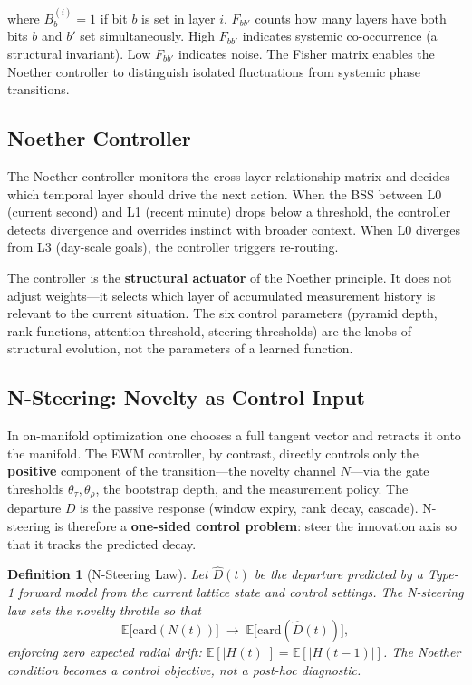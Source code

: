 \documentclass[11pt,a4paper]{article}
\newtheorem{definition}{Definition}[section]
\theoremstyle{remark}
\begin{document}
where $B^{(i)}_b = 1$ if bit $b$ is set in layer $i$. $F_{bb'}$ counts how many layers
have both bits $b$ and $b'$ set simultaneously. High $F_{bb'}$ indicates systemic
co-occurrence (a structural invariant). Low $F_{bb'}$ indicates noise. The Fisher matrix
enables the Noether controller to distinguish isolated fluctuations from systemic phase
transitions.

\subsection{Noether Controller}

The Noether controller monitors the cross-layer relationship matrix and decides which
temporal layer should drive the next action. When the BSS between L0 (current second)
and L1 (recent minute) drops below a threshold, the controller detects divergence and
overrides instinct with broader context. When L0 diverges from L3 (day-scale goals),
the controller triggers re-routing.

The controller is the \textbf{structural actuator} of the Noether principle. It does not
adjust weights---it selects which layer of accumulated measurement history is relevant
to the current situation. The six control parameters (pyramid depth, rank functions,
attention threshold, steering thresholds) are the knobs of structural evolution, not the
parameters of a learned function.

\subsection{N-Steering: Novelty as Control Input}
\label{sec:n-steering}

In on-manifold optimization one chooses a full tangent vector and retracts it
onto the manifold. The EWM controller, by contrast, directly controls only the
\textbf{positive} component of the transition---the novelty channel $N$---via
the gate thresholds $\theta_{\tau}, \theta_{\rho}$, the bootstrap depth, and the
measurement policy. The departure $D$ is the passive response (window expiry,
rank decay, cascade). N-steering is therefore a \textbf{one-sided control
problem}: steer the innovation axis so that it tracks the predicted decay.

\begin{definition}[N-Steering Law]
Let $\widehat{D}(t)$ be the departure predicted by a Type-1 forward model from
the current lattice state and control settings. The N-steering law sets the
novelty throttle so that
\begin{equation}
  \mathbb{E}\bigl[\text{card}(N(t))\bigr]
  \;\to\; \mathbb{E}\bigl[\text{card}(\widehat{D}(t))\bigr],
\end{equation}
enforcing zero \textit{expected} radial drift:
$\mathbb{E}[|H(t)|] = \mathbb{E}[|H(t-1)|]$. The Noether condition becomes a
control objective, not a post-hoc diagnostic.
\end{definition}
\end{document}
